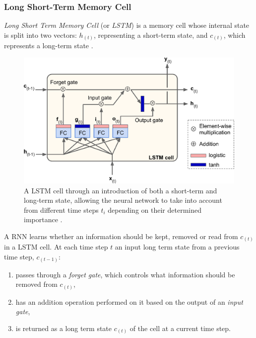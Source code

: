 \subsubsection{Long Short-Term Memory Cell}
\label{lstm}

\emph{Long Short Term Memory Cell} (or \emph{LSTM}) is a memory cell whose internal state is split into two vectors: $h_{(t)}$, representing a short-term state, and $c_{(t)}$, which represents a long-term state \cite{lstm_cell}. 

\begin{figure}[]
\centering
\includegraphics[scale=0.9]{figures/lstm_cell.png}
\caption{A LSTM cell through an introduction of both a short-term and long-term state, allowing the neural network to take into account from different time steps $t_i$ depending on their determined importance  \cite{handson_geron}.}
\end{figure}


A RNN learns whether an information should be kept, removed or read from $c_{(t)}$ in a LSTM cell. At each time step $t$ an input long term state from a previous time step, $c_{(t-1)}$:

\begin{enumerate}
\item passes through a \emph{forget gate}, which controls what information should be removed from $c_{(t)}$,
\item has an addition operation performed on it based on the output of an \emph{input gate},
\item is returned as a long term state $c_{(t)}$ of the cell at a current time step.
\end{enumerate}


